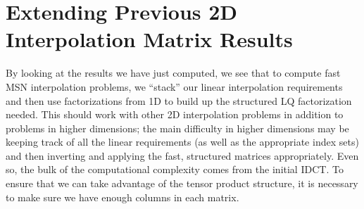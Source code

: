 \section{Extending Previous 2D \CV{} Interpolation Matrix Results}
\label{sec:CV_2D_other}

By looking at the results we have just computed, we see that to compute
fast MSN interpolation problems, we ``stack'' our linear interpolation
requirements and then use factorizations from 1D to build up the
structured LQ factorization needed.
This should work with other 2D interpolation problems in addition
to problems in higher dimensions;
the main difficulty in higher dimensions may be keeping track of
all the linear requirements (as well as the appropriate index sets)
and then inverting and applying the fast, structured matrices appropriately.
Even so, the bulk of the computational complexity comes from the 
initial IDCT.
To ensure that we can take advantage of the tensor product structure,
it is necessary to make sure we have enough columns in each matrix.

